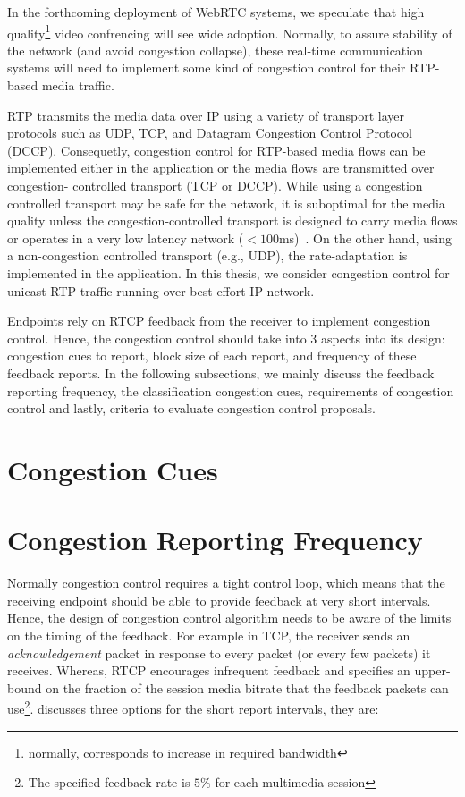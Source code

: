 In the forthcoming deployment of WebRTC systems, we speculate that high
quality\footnote{normally, corresponds to increase in required bandwidth}
video confrencing will see wide adoption. Normally, to assure stability of the
network (and avoid congestion collapse), these real-time communication systems
will need to implement some kind of congestion control for their RTP-based
media traffic.

RTP transmits the media data over IP using a variety of transport layer
protocols such as UDP, TCP, and Datagram Congestion Control Protocol (DCCP).
Consequetly, congestion control for RTP-based media flows can be implemented
either in the application or the media flows are transmitted over congestion-%
controlled transport (TCP or DCCP). While using a congestion controlled
transport may be safe for the network, it is suboptimal for the media quality
unless the congestion-controlled transport is designed to carry media flows or
operates in a very low latency network ($<100$ms)~\cite{Brosh:tcp-real-time}.
On the other hand, using a non-congestion controlled transport (e.g., UDP),
the rate-adaptation is implemented in the application.  In this thesis, we
consider congestion control for unicast RTP traffic running over best-effort
IP network.


Endpoints rely on RTCP feedback from the receiver to implement congestion
control. Hence, the congestion control should take into 3 aspects into its
design: congestion cues to report, block size of each report, and frequency of
these feedback reports. In the following subsections, we mainly discuss the
feedback reporting frequency, the classification congestion cues, requirements
of congestion control and lastly, criteria to evaluate congestion control
proposals.

\section{Congestion Cues}
\label{fw.cues}




\section{Congestion Reporting Frequency}
\label{fw.freq}

Normally congestion control requires a tight control loop, which means that
the receiving endpoint should be able to provide feedback at very short
intervals. Hence, the design of congestion control algorithm needs to be aware
of the limits on the timing of the feedback.  For example in TCP, the receiver
sends an \emph{acknowledgement} packet in response to every packet (or every
few packets) it receives. Whereas, RTCP encourages infrequent feedback and
specifies an upper-bound on the fraction of the session media bitrate that the
feedback packets can use\footnote{The specified feedback rate is $5\%$ for
each multimedia session}.  \cite{draft.rmcat.feedback} discusses three options
for the short report intervals, they are:

